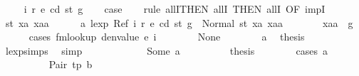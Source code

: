\begin{isabellebody}
\isamarkupfalse%
\isanewline
\ \ \isamarkupfalse%
\ {\isacharparenleft}{\kern0pt}{}\ i\ r\ e\ cd\ st\ g{\isacharparenright}{\kern0pt}\isanewline
\ \ \isamarkupfalse%
\ {\isacharquery}{\kern0pt}case\isanewline
\ \ \isamarkupfalse%
\ {\isacharparenleft}{\kern0pt}rule\ allI{\isacharbrackleft}{\kern0pt}THEN\ allI{\isacharcomma}{\kern0pt}\ THEN\ allI{\isacharcomma}{\kern0pt}\ OF\ impI{\isacharbrackright}{\kern0pt}{\isacharparenright}{\kern0pt}\isanewline
\ \ \ \ \isamarkupfalse%
\ st{}{\isacharprime}{\kern0pt}\ xa\ xaa\isanewline
\ \ \ \ \isamarkupfalse%
\ a{}{\isacharcolon}{\kern0pt}\ {\isachardoublequoteopen}lexp\ {\isacharparenleft}{\kern0pt}Ref\ i\ r{\isacharparenright}{\kern0pt}\ e\ cd\ st\ g\ {\isacharequal}{\kern0pt}\ Normal\ {\isacharparenleft}{\kern0pt}{\isacharparenleft}{\kern0pt}st{}{\isacharprime}{\kern0pt}{\isacharcomma}{\kern0pt}\ xa{\isacharparenright}{\kern0pt}{\isacharcomma}{\kern0pt}\ xaa{\isacharparenright}{\kern0pt}{\isachardoublequoteclose}\isanewline
\ \ \ \ \isamarkupfalse%
\ \isamarkupfalse%
\ {\isachardoublequoteopen}xaa\ {\isasymle}\ g{\isachardoublequoteclose}\isanewline
\ \ \ \ \isamarkupfalse%
\ {\isacharparenleft}{\kern0pt}cases\ {\isachardoublequoteopen}fmlookup\ {\isacharparenleft}{\kern0pt}denvalue\ e{\isacharparenright}{\kern0pt}\ i{\isachardoublequoteclose}{\isacharparenright}{\kern0pt}\isanewline
\ \ \ \ \ \ \isamarkupfalse%
\ None\isanewline
\ \ \ \ \ \ \isamarkupfalse%
\ a{}\ \isamarkupfalse%
\ {\isacharquery}{\kern0pt}thesis\ \isamarkupfalse%
\ lexp{\isachardot}{\kern0pt}simps{\isacharparenleft}{\kern0pt}{}{\isacharparenright}{\kern0pt}\ \isamarkupfalse%
\ simp\isanewline
\ \ \ \ \isamarkupfalse%
\isanewline
\ \ \ \ \ \ \isamarkupfalse%
\ {\isacharparenleft}{\kern0pt}Some\ a{\isacharparenright}{\kern0pt}\isanewline
\ \ \ \ \ \ \isamarkupfalse%
\ \isamarkupfalse%
\ {\isacharquery}{\kern0pt}thesis\isanewline
\ \ \ \ \ \ \isamarkupfalse%
\ {\isacharparenleft}{\kern0pt}cases\ a{\isacharparenright}{\kern0pt}\isanewline
\ \ \ \ \ \ \ \ \isamarkupfalse%
\ {\isacharparenleft}{\kern0pt}Pair\ tp\ b{\isacharparenright}{\kern0pt}\isanewline
\ \ \ \ \ \ \ \ \isamarkupfalse%
\ \isamarkupfalse%

\end{isabellebody}
